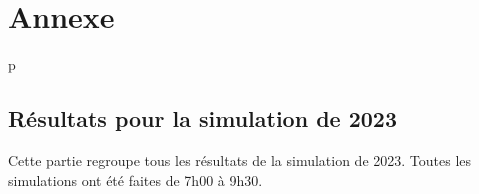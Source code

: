 \chapter*{Annexe}

\makeatletter
\renewcommand{\thesection}{\@arabic\c@section}
\makeatother
p
\setcounter{section}{0}

\section{Résultats pour la simulation de 2023}

Cette partie regroupe tous les résultats de la simulation de 2023. Toutes les simulations ont été faites de 7h00 à 9h30.
